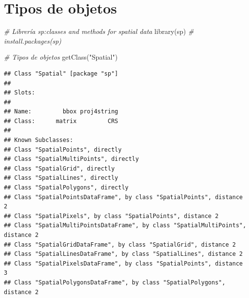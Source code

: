 \documentclass[
  spanish,
]{book}
\newenvironment{Shaded}{\begin{snugshade}}{\end{snugshade}}
\newcommand{\CommentTok}[1]{\textcolor[rgb]{0.56,0.35,0.01}{\textit{#1}}}
\newcommand{\FunctionTok}[1]{\textcolor[rgb]{0.00,0.00,0.00}{#1}}
\newcommand{\NormalTok}[1]{#1}
\newcommand{\StringTok}[1]{\textcolor[rgb]{0.31,0.60,0.02}{#1}}
\theoremstyle{break}
\theoremstyle{definition}
\theoremstyle{definition}
\theoremstyle{definition}
\theoremstyle{definition}
\theoremstyle{remark}
\begin{document}
\hypertarget{tipos-de-objetos}{%
\section{Tipos de objetos}\label{tipos-de-objetos}}

\begin{Shaded}
\begin{Highlighting}[]
\CommentTok{\# Librería sp:classes and methods for spatial data}
\FunctionTok{library}\NormalTok{(sp) }\CommentTok{\# install.packages(\textquotesingle{}sp\textquotesingle{})}

\CommentTok{\# Tipos de objetos}
\FunctionTok{getClass}\NormalTok{(}\StringTok{"Spatial"}\NormalTok{)}
\end{Highlighting}
\end{Shaded}

\begin{verbatim}
## Class "Spatial" [package "sp"]
## 
## Slots:
##                               
## Name:         bbox proj4string
## Class:      matrix         CRS
## 
## Known Subclasses: 
## Class "SpatialPoints", directly
## Class "SpatialMultiPoints", directly
## Class "SpatialGrid", directly
## Class "SpatialLines", directly
## Class "SpatialPolygons", directly
## Class "SpatialPointsDataFrame", by class "SpatialPoints", distance 2
## Class "SpatialPixels", by class "SpatialPoints", distance 2
## Class "SpatialMultiPointsDataFrame", by class "SpatialMultiPoints", distance 2
## Class "SpatialGridDataFrame", by class "SpatialGrid", distance 2
## Class "SpatialLinesDataFrame", by class "SpatialLines", distance 2
## Class "SpatialPixelsDataFrame", by class "SpatialPoints", distance 3
## Class "SpatialPolygonsDataFrame", by class "SpatialPolygons", distance 2
\end{verbatim}
\end{document}
